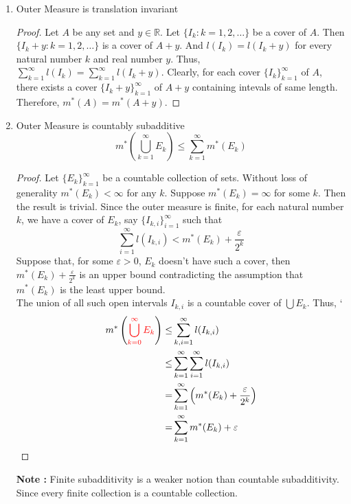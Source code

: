 \begin{enumerate}
\begin{proof}
	By monotonicity of Lebesgue outer measure, we have $m^\ast(J_1) \le m^\ast(I) \le m^\ast(J_2)$.
	However $m^\ast(J_1) = l(I)-\varepsilon$ and $m^\ast(J_2) = l(I)+\varepsilon$.
	Thus, $l(I)-\varepsilon \le m^\ast(I) \le l(I)+\varepsilon$.
	Therefore, $m^\ast(I) = l(I)$.

	\textbf{Case 3 : Unbounded Interval}
	Let $I$ be an unbounded interval.
	Then for any natural number $n$, there exists a closed bounded interval $J$ such that $J \subset I$ and $l(J) = n$.
	And $n = m^\ast(J) \le m^\ast(I),\ \forall n \in \mathbb{N}$.
	Therefore, $m^\ast(I) = \infty = l(I)$. 
	\end{proof}
	\item Outer Measure is translation invariant
	\begin{proof}
	Let $A$ be any set and $y \in \mathbb{R}$.
	Let $\{ I_k : k = 1,2,\dots \}$ be a cover of $A$.
	Then $\{ I_k+y : k = 1,2,\dots \}$ is a cover of $A+y$.
	And $l(I_k) = l(I_k+y)$ for every natural number $k$ and real number $y$.
	Thus, $\displaystyle \sum_{k=1}^\infty l(I_k) = \sum_{k=1}^\infty l(I_k+y)$.
	Clearly, for each cover $\{I_k\}_{k=1}^\infty$ of $A$, there exists a cover $\{ I_k+y \}_{k=1}^\infty$ of $A+y$ containing intevals of same length.
	Therefore, $m^\ast(A) = m^\ast(A+y)$.
	\end{proof}
	\item Outer Measure is countably subadditive
		\begin{equation}
			m^\ast \left( \bigcup_{k=1}^\infty E_k \right) \le \sum_{k=1}^\infty m^\ast(E_k)
		\end{equation}
	\begin{proof}
	Let $\{E_k\}_{k=1}^\infty$ be a countable collection of sets.
	Without loss of generality $m^\ast(E_k) < \infty$ for any $k$.
	Suppose $m^\ast(E_k) = \infty$ for some $k$. Then the result is trivial.
	Since the outer measure is finite, for each natural number $k$, we have a cover of $E_k$, say $\{ I_{k,i} \}_{i = 1}^\infty$ such that 
	\[ \sum_{i=1}^\infty l(I_{k,i}) < m^\ast(E_k) + \frac{\varepsilon}{2^k} \]
	Suppose that, for some $\varepsilon > 0$, $E_k$ doesn't have such a cover, then $m^\ast(E_k) + \frac{\varepsilon}{2^k}$ is an upper bound contradicting the assumption that $m^\ast(E_k)$ is the least upper bound.\\

	The union of all such open intervals $I_{k,i}$ is a countable cover of $\bigcup E_k$.
	Thus,
`	\begin{align*}
	m^\ast \left( {\color{red}\bigcup_{k = 0}^\infty E_k }\right)
	\le & \sum_{k,i=1}^\infty l(I_{k,i}) \\
	\le & \sum_{k=1}^\infty \sum_{i=1}^\infty l(I_{k,i}) \\
	= & \sum_{k=1}^\infty \left( m^\ast(E_k) + \frac{\varepsilon}{2^k} \right) \\
	= & \sum_{k=1}^\infty  m^\ast(E_k) + \varepsilon
	\end{align*}
\end{proof}
	\textbf{Note : } Finite subadditivity is a weaker notion than countable subadditivity.
	Since every finite collection is a countable collection.
\end{enumerate}

